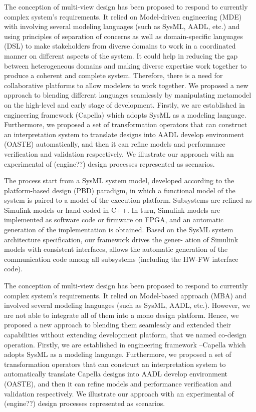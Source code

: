 The conception of multi-view design has been proposed to respond to currently complex system's requirements. It relied on Model-driven engineering (MDE) with involving several modeling languages (such as SysML, AADL, etc.) and using principles of separation of concerns as well as domain-specific languages (DSL) to make stakeholders from diverse domains to work in a coordinated manner on different aspects of the system. It could help in reducing the gap between heterogeneous domains and making diverse expertise work together to produce a coherent and complete system. Therefore, there is a need for collaborative platforms to allow modelers to work together. We proposed a new approach to blending different languages seamlessly by manipulating metamodel on the high-level and early stage of development. Firstly, we are established in engineering framework (Capella) which adopts SysML as a modeling language. Furthermore, we proposed a set of transformation operators that can construct an interpretation system to translate designs into AADL develop environment (OASTE) automatically, and then it can refine models and performance verification and validation respectively. We illustrate our approach with an experimental of (engine??) design processes represented as scenarios.


The process start from a SysML system model, developed according to
the platform-based design (PBD) paradigm, in which a functional model
of the system is paired to a model of the execution platform. Subsystems
are refined as Simulink models or hand coded in C++. In turn, Simulink
models are implemented as software code or firmware on FPGA, and an
automatic generation of the implementation is obtained. Based on the
SysML system architecture specification, our framework drives the gener-
ation of Simulink models with consistent interfaces, allows the automatic
generation of the communication code among all subsystems (including
the HW-FW interface code).

The conception of multi-view design has been proposed to respond to currently complex system's requirements. It relied on Model-based approach (MBA) and involved several modeling languages (such as SysML, AADL, etc.). However, we are not able to integrate all of them into a mono design platform. Hence, we proposed a new approach to blending them seamlessly and extended their capabilities without extending development platform, that we named co-design operation. Firstly, we are established in engineering framework --Capella which adopts SysML as a modeling language. Furthermore, we proposed a set of transformation operators that can construct an interpretation system to automatically translate  Capella designs into AADL develop environment (OASTE), and then it can refine models and performance verification and validation respectively. We illustrate our approach with an experimental of (engine??) design processes represented as scenarios.



